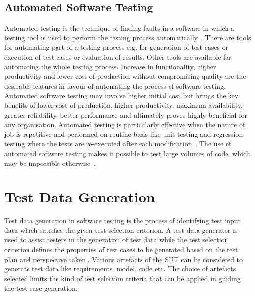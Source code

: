 \subsection{Automated Software Testing}
Automated testing is the technique of finding faults in a software in which a testing tool is used to perform the testing process automatically~\cite{leitner2007reconciling}. There are tools for automating part of a testing process e.g. for generation of test cases or execution of test cases or evaluation of results. Other tools are available for automating the whole testing process. Increase in functionality, higher productivity and lower cost of production without compromising quality are the desirable features in favour of automating the process of software testing. Automated software testing may involve higher initial cost but brings the key benefits of lower cost of production, higher productivity, maximum availability, greater reliability, better performance and ultimately proves highly beneficial for any organisation. Automated testing is particularly effective when the nature of job is repetitive and performed on routine basis like unit testing and regression testing where the tests are re-executed after each modification~\cite{huang2003automated}. The use of automated software testing makes it possible to test large volumes of code, which may be impossible otherwise~\cite{ramamoorthy1975testing}.

\section{Test Data Generation}
Test data generation in software testing is the process of identifying test input data which satisfies the given test selection criterion. A test data generator is used to assist testers in the generation of test data while the test selection criterion defines the properties of test cases to be generated based on the test plan and perspective taken \cite{korel1990automated}. Various artefacts of the SUT can be considered to generate test data like requirements, model, code etc. The choice of artefacts selected limits the kind of test selection criteria that can be applied in guiding the test case generation. 

